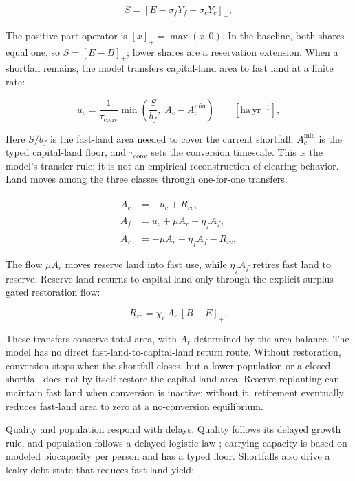 \documentclass[preprint,12pt,authoryear]{elsarticle}
\newcommand{\pos}[1]{\left[#1\right]_+}
\newcommand{\Acmin}{A_c^{\min}}
\newcommand{\tconv}{\tau_{\mathrm{conv}}}
\begin{document}
\begin{equation}\label{eq:S}
S=\pos{E-\sigma_f Y_f-\sigma_c Y_c},
\end{equation}

The positive-part operator is $\pos{x}=\max(x,0)$. In the baseline, both shares equal one, so $S=\pos{E-B}$; lower shares are a reservation extension. When a shortfall remains, the model transfers capital-land area to fast land at a finite rate:

\begin{equation}\label{eq:uc}u_c=\frac{1}{\tconv}\min\!\left(\frac{S}{b_f},\;A_c-\Acmin\right)\qquad[\mathrm{ha\,yr^{-1}}],
\end{equation}

Here $S/b_f$ is the fast-land area needed to cover the current shortfall, $\Acmin$ is the typed capital-land floor, and $\tconv$ sets the conversion timescale. This is the model's transfer rule; it is not an empirical reconstruction of clearing behavior. Land moves among the three classes through one-for-one transfers:

\begin{align}
\dot A_c&=-u_c+R_{rc},\label{eq:Ac}\\
\dot A_f&=u_c+\mu A_r-\eta_f A_f,\label{eq:Af}\\
\dot A_r&=-\mu A_r+\eta_f A_f-R_{rc},\label{eq:Ar}
\end{align}

The flow $\mu A_r$ moves reserve land into fast use, while $\eta_fA_f$ retires fast land to reserve. Reserve land returns to capital land only through the explicit surplus-gated restoration flow:

\begin{equation}\label{eq:Rrc}
R_{rc}=\chi_r\,A_r\,\pos{B-E},
\end{equation}

These transfers conserve total area, with $A_r$ determined by the area balance. The model has no direct fast-land-to-capital-land return route. Without restoration, conversion stops when the shortfall closes, but a lower population or a closed shortfall does not by itself restore the capital-land area. Reserve replanting can maintain fast land when conversion is inactive; without it, retirement eventually reduces fast-land area to zero at a no-conversion equilibrium.

Quality and population respond with delays. Quality follows its delayed growth rule, and population follows a delayed logistic law \citep{Pearl1925,Hutchinson1948}; carrying capacity is based on modeled biocapacity per person and has a typed floor. Shortfalls also drive a leaky debt state that reduces fast-land yield:
\end{document}
